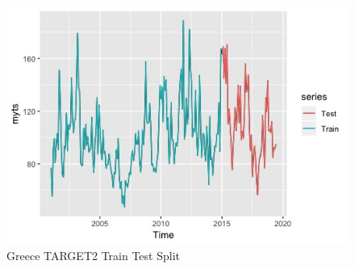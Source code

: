 \documentclass[12pt]{article}
\begin{document}
\begin{figure}
  \center
  \includegraphics[width=0.8\linewidth]{split.jpeg}
  \caption{Greece TARGET2 Train Test Split}
  \label{fig:split}
\end{figure}

\pagebreak
\end{document}
